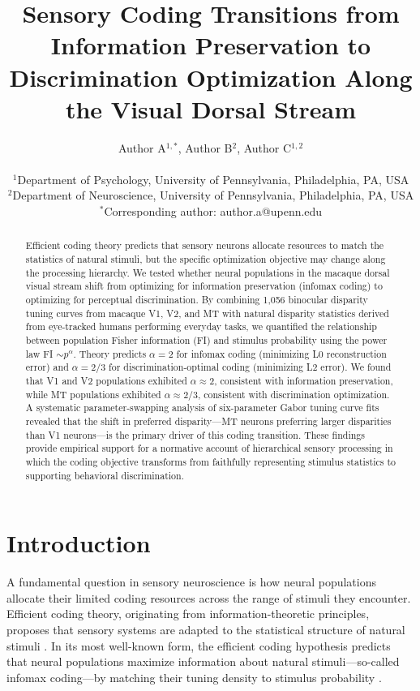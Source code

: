 \documentclass[12pt]{article}
\title{Sensory Coding Transitions from Information Preservation to Discrimination Optimization Along the Visual Dorsal Stream}
\author{Author A$^{1,*}$, Author B$^{2}$, Author C$^{1,2}$ \\
\\
\small $^{1}$Department of Psychology, University of Pennsylvania, Philadelphia, PA, USA \\
\small $^{2}$Department of Neuroscience, University of Pennsylvania, Philadelphia, PA, USA \\
\small $^{*}$Corresponding author: author.a@upenn.edu}
\date{}
\begin{document}
\maketitle

\begin{abstract}
Efficient coding theory predicts that sensory neurons allocate resources to match the statistics of natural stimuli, but the specific optimization objective may change along the processing hierarchy. We tested whether neural populations in the macaque dorsal visual stream shift from optimizing for information preservation (infomax coding) to optimizing for perceptual discrimination. By combining 1,056 binocular disparity tuning curves from macaque V1, V2, and MT with natural disparity statistics derived from eye-tracked humans performing everyday tasks, we quantified the relationship between population Fisher information (FI) and stimulus probability using the power law FI $\sim p^{\alpha}$. Theory predicts $\alpha = 2$ for infomax coding (minimizing L0 reconstruction error) and $\alpha = 2/3$ for discrimination-optimal coding (minimizing L2 error). We found that V1 and V2 populations exhibited $\alpha \approx 2$, consistent with information preservation, while MT populations exhibited $\alpha \approx 2/3$, consistent with discrimination optimization. A systematic parameter-swapping analysis of six-parameter Gabor tuning curve fits revealed that the shift in preferred disparity---MT neurons preferring larger disparities than V1 neurons---is the primary driver of this coding transition. These findings provide empirical support for a normative account of hierarchical sensory processing in which the coding objective transforms from faithfully representing stimulus statistics to supporting behavioral discrimination.
\end{abstract}

\section{Introduction}

A fundamental question in sensory neuroscience is how neural populations allocate their limited coding resources across the range of stimuli they encounter. Efficient coding theory, originating from information-theoretic principles, proposes that sensory systems are adapted to the statistical structure of natural stimuli \citep{barlow1961possible, simoncelli2001natural}. In its most well-known form, the efficient coding hypothesis predicts that neural populations maximize information about natural stimuli---so-called infomax coding---by matching their tuning density to stimulus probability \citep{laughlin1981simple, ganguli2012efficient}.
\end{document}
